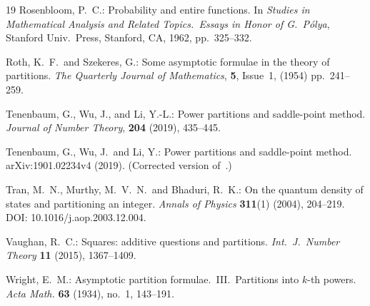\documentclass[12pt]{amsart}
\theoremstyle{definition}
\begin{document}
\begin{thebibliography}{19}
Rosenbloom, P.~C.:
Probability and entire functions.
In \textit{Studies in Mathematical Analysis and Related Topics.\ Essays in Honor of G.\ P\'olya},
Stanford Univ.\ Press, Stanford, CA, 1962, pp.~325--332.

Roth, K.~F.\ and Szekeres, G.:
Some asymptotic formulae in the theory of partitions.
\textit{The Quarterly Journal of Mathematics}, \textbf{5}, Issue~1, (1954) pp.~241--259.

Tenenbaum, G., Wu, J., and Li, Y.-L.:
Power partitions and saddle-point method.
\textit{Journal of Number Theory}, \textbf{204} (2019), 435--445.

Tenenbaum, G., Wu, J.\ and Li, Y.:
Power partitions and saddle-point method.
arXiv:1901.02234v4 (2019). (Corrected version of~\cite{TWL}.)

Tran, M.~N., Murthy, M.~V.~N.\ and Bhaduri, R.~K.:
On the quantum density of states and partitioning an integer.
\textit{Annals of Physics} \textbf{311}(1) (2004), 204--219.
DOI: 10.1016/j.aop.2003.12.004.

Vaughan, R.~C.:
Squares: additive questions and partitions.
\textit{Int.\ J.\ Number Theory} \textbf{11} (2015), 1367--1409.

Wright, E.~M.:
Asymptotic partition formulae.\ III\@.\ Partitions into $k$-th powers.
\textit{Acta Math.} \textbf{63} (1934), no.~1, 143--191.

\end{thebibliography}
\end{document}
